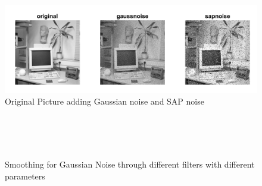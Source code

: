 \documentclass{article}
\begin{document}
\begin{enumerate}
\begin{figure}[H]
    \centering
    \includegraphics[width = \linewidth]{Lab1_3-1_Q17_fig1_original.png}
    \caption{Original Picture adding Gaussian noise and SAP noise}
    \label{figOrg}
\end{figure}

\begin{figure}[H]
    \centering
    \\
    \\
    \\
    \caption{Smoothing for Gaussian Noise through different filters with different parameters}
    \label{figGN}
\end{figure}



\end{enumerate}
\end{document}
